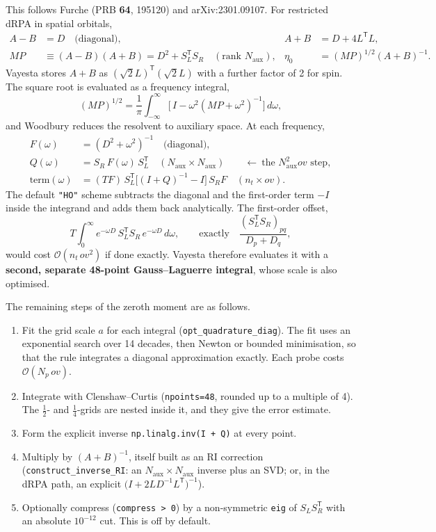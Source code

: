 \documentclass[11pt,a4paper]{article}
\newcommand{\code}[1]{\texttt{\small #1}}
\newcommand{\Naux}{N_{\mathrm{aux}}}
\newcommand{\nt}{n_{t}}
\newcommand{\Np}{N_{p}}
\newcommand{\ov}{ov}
\begin{document}
This follows Furche (PRB \textbf{64}, 195120) and arXiv:2301.09107. For restricted dRPA in
spatial orbitals,
\begin{align}
  A-B &= D \quad\text{(diagonal)}, &
  A+B &= D + 4L^{\mathsf T}L, \\
  MP &\equiv (A-B)(A+B) = D^2 + S_L^{\mathsf T}S_R \quad(\text{rank }\Naux), &
  \eta_0 &= (MP)^{1/2}(A+B)^{-1}.
\end{align}
Vayesta stores $A+B$ as $(\sqrt2 L)^{\mathsf T}(\sqrt2 L)$ with a further factor of 2 for
spin. The square root is evaluated as a frequency integral,
\begin{equation}
  (MP)^{1/2} = \frac{1}{\pi}\int_{-\infty}^{\infty}
     \Big[\,I - \omega^2 (MP+\omega^2)^{-1}\Big]\,d\omega ,
\end{equation}
and Woodbury reduces the resolvent to auxiliary space. At each frequency,
\begin{align}
  F(\omega) &= (D^2+\omega^2)^{-1} \quad\text{(diagonal)},\\
  Q(\omega) &= S_R\,F(\omega)\,S_L^{\mathsf T} \quad(\Naux\times\Naux)
     \qquad\leftarrow\ \text{the } \Naux^2\ov \text{ step},\\
  \text{term}(\omega) &= (TF)\,S_L^{\mathsf T}\big[(I+Q)^{-1}-I\big]\,S_R F
     \quad(\nt\times\ov).
\end{align}
The default \code{"HO"} scheme subtracts the diagonal and the first-order term $-I$ inside the
integrand and adds them back analytically. The first-order offset,
\begin{equation}
  T\!\int_0^\infty e^{-\omega D}\,S_L^{\mathsf T}S_R\,e^{-\omega D}\,d\omega,
  \qquad\text{exactly}\quad \frac{(S_L^{\mathsf T}S_R)_{pq}}{D_p+D_q},
\end{equation}
would cost $\mathcal{O}(\nt\,\ov^2)$ if done exactly. Vayesta therefore evaluates it with a
\textbf{second, separate 48-point Gauss--Laguerre integral}, whose scale is also optimised.

The remaining steps of the zeroth moment are as follows.
\begin{enumerate}
  \item Fit the grid scale $a$ for each integral (\code{opt\_quadrature\_diag}). The fit uses an
        exponential search over 14 decades, then Newton or bounded minimisation, so that the rule
        integrates a diagonal approximation exactly. Each probe costs $\mathcal{O}(\Np\,\ov)$.
  \item Integrate with Clenshaw--Curtis (\code{npoints=48}, rounded up to a multiple of 4). The
        $\tfrac12$- and $\tfrac14$-grids are nested inside it, and they give the error estimate.
  \item Form the explicit inverse \code{np.linalg.inv(I + Q)} at every point.
  \item Multiply by $(A+B)^{-1}$, itself built as an RI correction (\code{construct\_inverse\_RI}:
        an $\Naux\times\Naux$ inverse plus an SVD; or, in the dRPA path, an explicit
        $\big(I+2LD^{-1}L^{\mathsf T}\big)^{-1}$).
  \item Optionally compress (\code{compress > 0}) by a non-symmetric \code{eig} of
        $S_LS_R^{\mathsf T}$ with an absolute $10^{-12}$ cut. This is off by default.
\end{enumerate}
\end{document}
